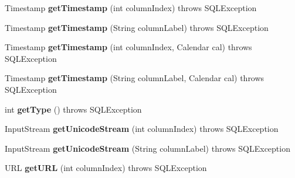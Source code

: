 \begin{DoxyCompactItemize}
\mbox{\label{classsimpledb_1_1jdbc_1_1ResultSetAdapter_afdaffcc5573e39a17426150b9100b024}} 
Timestamp {\bfseries get\+Timestamp} (int column\+Index)  throws S\+Q\+L\+Exception 
\item 
\mbox{\label{classsimpledb_1_1jdbc_1_1ResultSetAdapter_ad4b515847ffe442f90465d074a274685}} 
Timestamp {\bfseries get\+Timestamp} (String column\+Label)  throws S\+Q\+L\+Exception 
\item 
\mbox{\label{classsimpledb_1_1jdbc_1_1ResultSetAdapter_a9b4e0c23fd2810a9cb84a8d1df3d1cf3}} 
Timestamp {\bfseries get\+Timestamp} (int column\+Index, Calendar cal)  throws S\+Q\+L\+Exception 
\item 
\mbox{\label{classsimpledb_1_1jdbc_1_1ResultSetAdapter_ab15a1e6824d1683abe58d83f7775b94d}} 
Timestamp {\bfseries get\+Timestamp} (String column\+Label, Calendar cal)  throws S\+Q\+L\+Exception 
\item 
\mbox{\label{classsimpledb_1_1jdbc_1_1ResultSetAdapter_a5d88f305de5731da3ffe3bb59b90ad09}} 
int {\bfseries get\+Type} ()  throws S\+Q\+L\+Exception 
\item 
\mbox{\label{classsimpledb_1_1jdbc_1_1ResultSetAdapter_a582cb2dc9123ac73d875f244c69ba03e}} 
Input\+Stream {\bfseries get\+Unicode\+Stream} (int column\+Index)  throws S\+Q\+L\+Exception 
\item 
\mbox{\label{classsimpledb_1_1jdbc_1_1ResultSetAdapter_ae1804bb9900c61ef734100543790db5b}} 
Input\+Stream {\bfseries get\+Unicode\+Stream} (String column\+Label)  throws S\+Q\+L\+Exception 
\item 
\mbox{\label{classsimpledb_1_1jdbc_1_1ResultSetAdapter_a8af480c1b658ebe2637ccaef32778b6f}} 
U\+RL {\bfseries get\+U\+RL} (int column\+Index)  throws S\+Q\+L\+Exception 
\item 
\mbox{\label{classsimpledb_1_1jdbc_1_1ResultSetAdapter_aa34c2d97501f74d7e13de91efe797fbc}} 

\end{DoxyCompactItemize}
